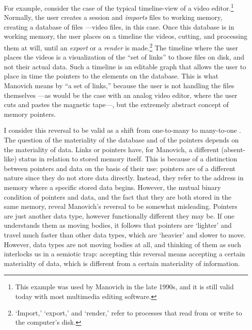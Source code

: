 For example, consider the case of the typical timeline-view of a video editor.\footnote{This example was used by Manovich in the late 1990s, and it is still valid today with most multimedia editing software.} Normally, the user creates a session and \textit{imports} files to working memory, creating a database of files ---video files, in this case. Once this database is in working memory, the user places on a timeline the videos, cutting, and processing them at will, until an \textit{export} or a \textit{render} is made.\footnote{`Import,' `export,' and `render,' refer to processes that read from or write to the computer's disk.} The timeline where the user places the videos is a visualization of the ``set of links'' to those files on disk, and not their actual data. Such a timeline is an editable graph that allows the user to place in time the pointers to the elements on the database. This is what Manovich means by ``a set of links,'' because the user is not handling the files themselves ---as would be the case with an analog video editor, where the user cuts and pastes the magnetic tape---, but the extremely abstract concept of memory pointers. 

I consider this reversal to be valid as a shift from one-to-many to many-to-one . The question of the materiality of the database and of the pointers depends on the materiality of data. Links or pointers have, for Manovich, a different (absent-like) status in relation to stored memory itself. This is because of a distinction between pointers and data on the basis of their use: pointers are of a different nature since they do not store data directly. Instead, they refer to the address in memory where a specific stored data begins. However, the mutual binary condition of pointers and data, and the fact that they are both stored in the same memory, reveal Manovich's reversal to be somewhat misleading. Pointers are just another data type, however functionally different they may be. If one understands them as moving bodies, it follows that pointers are `lighter' and travel much faster than other data types, which are `heavier' and slower to move. However, data types are not moving bodies at all, and thinking of them as such interlocks us in a semiotic trap: accepting this reversal means accepting a certain materiality of data, which is different from a certain materiality of information.